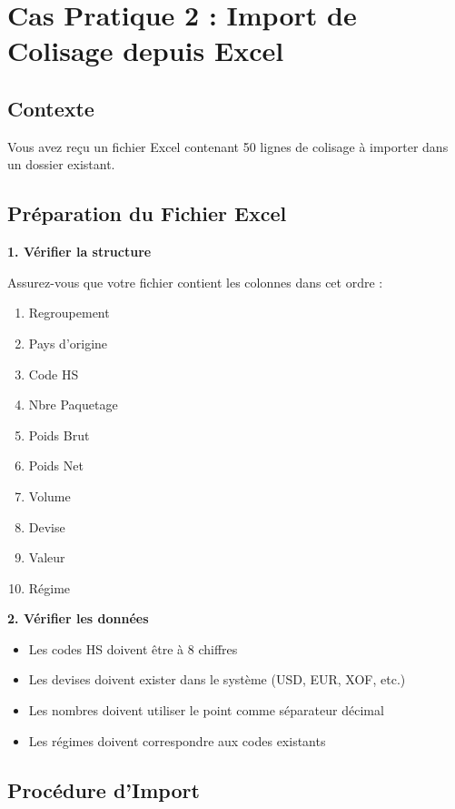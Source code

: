 \documentclass[12pt,a4paper]{report}
\begin{document}
\section{Cas Pratique 2 : Import de Colisage depuis Excel}

\subsection{Contexte}

Vous avez reçu un fichier Excel contenant 50 lignes de colisage à importer dans un dossier existant.

\subsection{Préparation du Fichier Excel}

\textbf{1. Vérifier la structure}

Assurez-vous que votre fichier contient les colonnes dans cet ordre :
\begin{enumerate}[leftmargin=*]
    \item Regroupement
    \item Pays d'origine
    \item Code HS
    \item Nbre Paquetage
    \item Poids Brut
    \item Poids Net
    \item Volume
    \item Devise
    \item Valeur
    \item Régime
\end{enumerate}

\textbf{2. Vérifier les données}

\begin{itemize}[leftmargin=*]
    \item Les codes HS doivent être à 8 chiffres
    \item Les devises doivent exister dans le système (USD, EUR, XOF, etc.)
    \item Les nombres doivent utiliser le point comme séparateur décimal
    \item Les régimes doivent correspondre aux codes existants
\end{itemize}

\subsection{Procédure d'Import}
\end{document}
